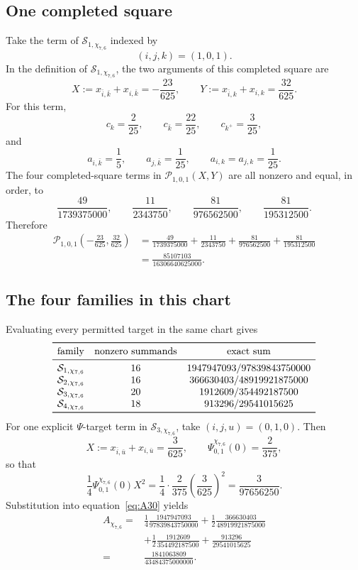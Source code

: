 \subsection{One completed square}

Take the term of $\mathcal S_{1,\chi_{7,6}}$ indexed by
\[
 (i,j,k)=(1,0,1).
\]
In the definition of $\mathcal S_{1,\chi_{7,6}}$, the two arguments of this
completed square are
\[
 X:=x_{\bar i,\bar k}+x_{i,\bar k}=-\frac{23}{625},
 \qquad
 Y:=x_{\bar i,k}+x_{i,k}=\frac{32}{625}.
\]
For this term,
\[
 c_k=\frac2{25},\qquad
 c_{\bar k}=\frac{22}{25},\qquad
 c_{k^+}=\frac3{25},
\]
and
\[
 a_{i,\bar k}=\frac15,\qquad
 a_{j,\bar k}=\frac1{25},\qquad
 a_{i,k}=a_{j,k}=\frac1{25}.
\]
The four completed-square terms in $\mathcal P_{1,0,1}(X,Y)$ are all
nonzero and equal, in order, to
\[
 \frac{49}{1739375000},\qquad
 \frac{11}{2343750},\qquad
 \frac{81}{976562500},\qquad
 \frac{81}{195312500}.
\]
Therefore
\[
\begin{aligned}
 \mathcal P_{1,0,1}\left(-\frac{23}{625},\frac{32}{625}\right)
 &={}
 \frac{49}{1739375000}
 +\frac{11}{2343750}
 +\frac{81}{976562500}
 +\frac{81}{195312500}\\
 &=\frac{85107103}{16306640625000}.
\end{aligned}
\]

\subsection{The four families in this chart}

Evaluating every permitted target in the same chart gives
\[
\begin{array}{lcc}
\toprule
\text{family}&\text{nonzero summands}&\text{exact sum}\\
\midrule
\mathcal S_{1,\chi_{7,6}}&16&1947947093/97839843750000\\
\mathcal S_{2,\chi_{7,6}}&16&366630403/48919921875000\\
\mathcal S_{3,\chi_{7,6}}&20&1912609/354492187500\\
\mathcal S_{4,\chi_{7,6}}&18&913296/29541015625\\
\bottomrule
\end{array}
\]
For one explicit $\Psi$-target term in $\mathcal S_{3,\chi_{7,6}}$, take
$(i,j,u)=(0,1,0)$.  Then
\[
 X:=x_{\bar i,\bar u}+x_{i,\bar u}=\frac3{625},
 \qquad
 \Psi^{\chi_{7,6}}_{0,1}(0)=\frac2{375},
\]
so that
\[
 \frac14\Psi^{\chi_{7,6}}_{0,1}(0)X^2
 =\frac14\cdot\frac2{375}\left(\frac3{625}\right)^2
 =\frac3{97656250}.
\]
Substitution into equation~\eqref{eq:A30} yields
\[
\begin{aligned}
A_{\chi_{7,6}}
={}&\frac14\frac{1947947093}{97839843750000}
+\frac12\frac{366630403}{48919921875000}\\
&+\frac12\frac{1912609}{354492187500}
+\frac{913296}{29541015625}\\
={}&\boxed{\frac{1841063809}{43484375000000}}.
\end{aligned}
\]

